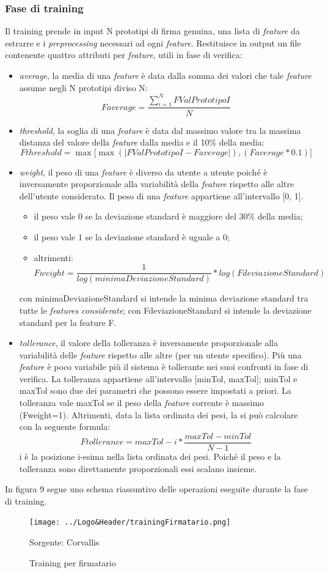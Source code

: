 \subsubsection*{Fase di training}
\label{2.1.4.1}
Il training prende in input N prototipi di firma genuina, una lista di \emph{feature} da estrarre e i \emph{preprocessing} necessari ad ogni \emph{feature}. Restituisce in output un file contenente quattro attributi per \emph{feature}, utili in fase di verifica:
\begin{itemize}
\item \emph{average}, la media di una \emph{feature} è data dalla somma dei valori che tale \emph{feature} assume negli N prototipi diviso N:
\[Faverage =
\frac{\sum\limits_{i=1}^N FValPrototipoI}{N}
\]
\item \emph{threshold}, la soglia di una \emph{feature} è data dal massimo valore tra la massima distanza del valore della \emph{feature} dalla media e il 10\% della media:
\[Fthreshold = 
\max \lbrack \max ( |FValPrototipoI - Faverage| ) , ( Faverage * 0.1 )\rbrack
\]
\item \emph{weight}, il peso di una \emph{feature} è diverso da utente a utente poiché è inversamente proporzionale alla variabilità della \emph{feature} rispetto alle altre dell'utente considerato. Il peso di una \emph{feature} appartiene all'intervallo [0, 1].
\begin{itemize}
\item il peso vale 0 se la deviazione standard è maggiore del 30\% della media;
\item il peso vale 1 se la deviazione standard è uguale a 0;
\item altrimenti:
\[Fweight = \frac{1}{log(minimaDeviazioneStandard)} * log(FdeviazioneStandard)\]
\end{itemize}
con minimaDeviazioneStandard si intende la minima deviazione standard tra tutte le \emph{features considerate}; con FdeviazioneStandard si intende la deviazione standard per la feature F.
\item \emph{tollerance}, il valore della tolleranza è inversamente proporzionale alla variabilità delle \emph{feature} rispetto alle altre (per un utente specifico). Più una \emph{feature} è poco variabile più il sistema è tollerante nei suoi confronti in fase di verifica. La tolleranza appartiene all'intervallo [minTol, maxTol]; minTol e maxTol sono due dei parametri che possono essere impostati a priori. La tolleranza vale maxTol se il peso della \emph{feature} corrente è massimo (Fweight=1). Altrimenti, data la lista ordinata dei pesi, la si può calcolare con la seguente formula:
\[Ftollerance=maxTol - i * \frac{maxTol - minTol}{N-1}\]
i è la posizione i-esima nella lista ordinata dei pesi. Poiché il peso e la tolleranza sono direttamente proporzionali essi scalano insieme.
\end{itemize}
In figura 9 segue uno schema riassuntivo delle operazioni eseguite durante la fase di training.
\begin{figure}[H]
\centering
\texttt{[image: ../Logo\&Header/trainingFirmatario.png]}
\caption{Training per firmatario}Sorgente: Corvallis
\end{figure}


